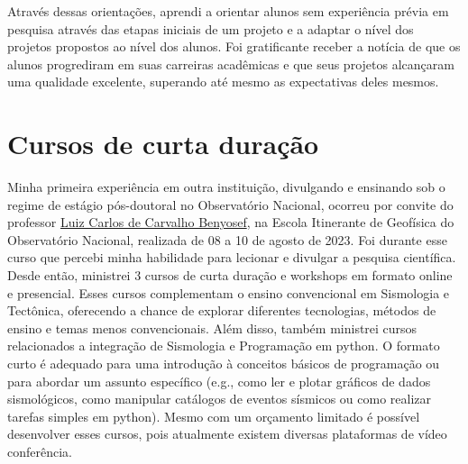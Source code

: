 \documentclass[10pt,a4paper,oneside]{book}
\begin{document}
Através dessas orientações, aprendi a orientar alunos sem experiência prévia em pesquisa através das etapas iniciais de um projeto e a adaptar o nível dos projetos propostos ao nível dos alunos. Foi gratificante receber a notícia de que os alunos progrediram em suas carreiras acadêmicas e que seus projetos alcançaram uma qualidade excelente, superando até mesmo as expectativas deles mesmos.

\section{Cursos de curta duração}
\label{sec_workshops}

Minha primeira experiência em outra instituição, divulgando e ensinando sob o regime de estágio pós-doutoral no Observatório Nacional, ocorreu por convite do professor \href{http://lattes.cnpq.br/4046823088402890}{Luiz Carlos de Carvalho Benyosef}, na Escola Itinerante de Geofísica do Observatório Nacional, realizada de 08 a 10 de agosto de 2023. Foi durante esse curso que percebi minha habilidade para lecionar e divulgar a pesquisa científica. Desde então, ministrei 3 cursos de curta duração e workshops em formato online e presencial. Esses cursos complementam o ensino convencional em Sismologia e Tectônica, oferecendo a chance de explorar diferentes tecnologias, métodos de ensino e temas menos convencionais. Além disso, também ministrei cursos relacionados a integração de Sismologia e Programação em python. O formato curto é adequado para uma introdução à conceitos básicos de programação ou para abordar um assunto específico (e.g., como ler e plotar gráficos de dados sismológicos, como manipular catálogos de eventos sísmicos ou como realizar tarefas simples em python). Mesmo com um orçamento limitado é possível desenvolver esses cursos, pois atualmente existem diversas plataformas de vídeo conferência.

\bigskip
\end{document}
